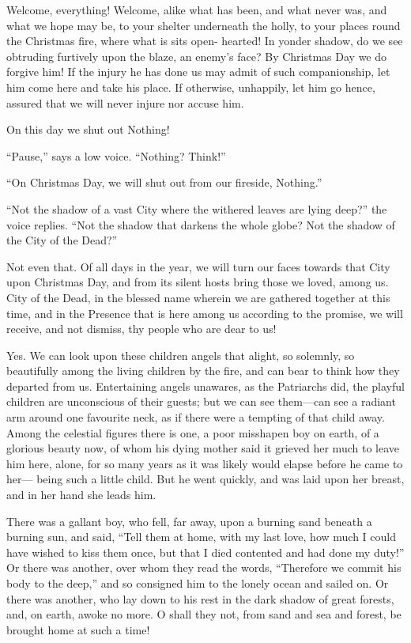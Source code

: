 Welcome, everything!  Welcome, alike what has been, and what never
was, and what we hope may be, to your shelter underneath the holly,
to your places round the Christmas fire, where what is sits open-%
hearted!  In yonder shadow, do we see obtruding furtively upon the
blaze, an enemy's face?  By Christmas Day we do forgive him!  If the
injury he has done us may admit of such companionship, let him come
here and take his place.  If otherwise, unhappily, let him go hence,
assured that we will never injure nor accuse him.

On this day we shut out Nothing!

``Pause,'' says a low voice.  ``Nothing?  Think!''

``On Christmas Day, we will shut out from our fireside, Nothing.''

``Not the shadow of a vast City where the withered leaves are lying
deep?'' the voice replies.  ``Not the shadow that darkens the whole
globe?  Not the shadow of the City of the Dead?''

Not even that.  Of all days in the year, we will turn our faces
towards that City upon Christmas Day, and from its silent hosts
bring those we loved, among us.  City of the Dead, in the blessed
name wherein we are gathered together at this time, and in the
Presence that is here among us according to the promise, we will
receive, and not dismiss, thy people who are dear to us!

Yes.  We can look upon these children angels that alight, so
solemnly, so beautifully among the living children by the fire, and
can bear to think how they departed from us.  Entertaining angels
unawares, as the Patriarchs did, the playful children are
unconscious of their guests; but we can see them---can see a radiant
arm around one favourite neck, as if there were a tempting of that
child away.  Among the celestial figures there is one, a poor
misshapen boy on earth, of a glorious beauty now, of whom his dying
mother said it grieved her much to leave him here, alone, for so
many years as it was likely would elapse before he came to her---%
being such a little child.  But he went quickly, and was laid upon
her breast, and in her hand she leads him.

There was a gallant boy, who fell, far away, upon a burning sand
beneath a burning sun, and said, ``Tell them at home, with my last
love, how much I could have wished to kiss them once, but that I
died contented and had done my duty!''  Or there was another, over
whom they read the words, ``Therefore we commit his body to the
deep,'' and so consigned him to the lonely ocean and sailed on.  Or
there was another, who lay down to his rest in the dark shadow of
great forests, and, on earth, awoke no more.  O shall they not, from
sand and sea and forest, be brought home at such a time!

